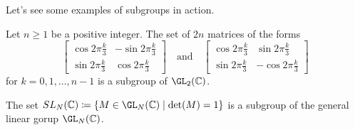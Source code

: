 Let's see some examples of subgroups in action.

\begin{example}
    Let $n\geq1$ be a positive integer.
    The set of $2n$ matrices of the forms
    \[
        \begin{bmatrix}
            \cos2\pi\frac{k}{3} & -\sin2\pi\frac{k}{3}\\ 
            \sin2\pi\frac{k}{3} & \cos2\pi\frac{k}{3}
        \end{bmatrix} \quad \text{and} \quad
        \begin{bmatrix}
            \cos2\pi\frac{k}{3} & \sin2\pi\frac{k}{3}\\ 
            \sin2\pi\frac{k}{3} & -\cos2\pi\frac{k}{3}
        \end{bmatrix}
    \]
    for $k=0,1,\dots,n-1$ is a subgroup of $\GL_2(\C)$.
\end{example}

\begin{example}
    The set $SL_N(\C) \coloneq \{M \in \GL_N(\C) \mid \det(M)=1 \}$ 
    is a subgroup of the general linear gorup $\GL_N(\C)$.
\end{example}